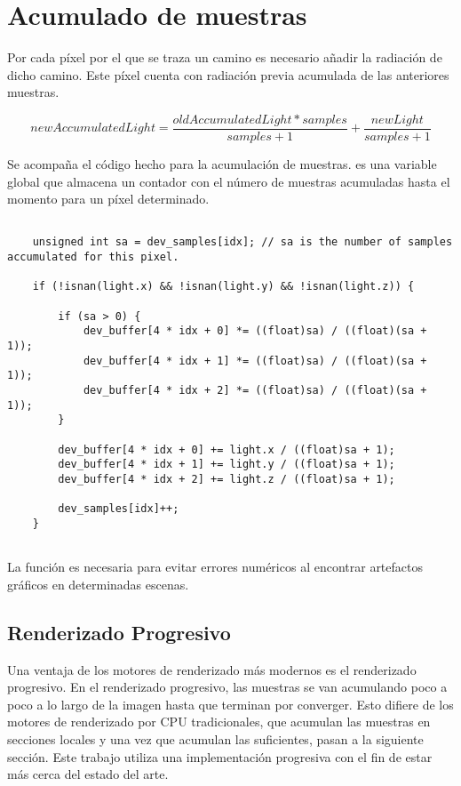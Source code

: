 \section{Acumulado de muestras}
	
Por cada píxel por el que se traza un camino es necesario añadir la radiación de dicho camino. Este píxel cuenta con radiación previa acumulada de las anteriores muestras.

\[{newAccumulatedLight = \frac{oldAccumulatedLight * samples}{samples + 1} + \frac{newLight}{samples + 1}}\]
	
Se acompaña el código hecho para la acumulación de muestras.  es una variable global que almacena un contador con el número de muestras acumuladas hasta el momento para un píxel determinado.

\begin{lstlisting}
	
	unsigned int sa = dev_samples[idx]; // sa is the number of samples accumulated for this pixel.
	
	if (!isnan(light.x) && !isnan(light.y) && !isnan(light.z)) {

        if (sa > 0) {
            dev_buffer[4 * idx + 0] *= ((float)sa) / ((float)(sa + 1));
            dev_buffer[4 * idx + 1] *= ((float)sa) / ((float)(sa + 1));
            dev_buffer[4 * idx + 2] *= ((float)sa) / ((float)(sa + 1));
        }

        dev_buffer[4 * idx + 0] += light.x / ((float)sa + 1);
        dev_buffer[4 * idx + 1] += light.y / ((float)sa + 1);
        dev_buffer[4 * idx + 2] += light.z / ((float)sa + 1);

        dev_samples[idx]++;
    }
	
\end{lstlisting}

La función  es necesaria para evitar errores numéricos al encontrar artefactos gráficos en determinadas escenas. 
	
\subsection{Renderizado Progresivo}
\label{progressiverender}
		
	Una ventaja de los motores de renderizado más modernos es el renderizado progresivo. En el renderizado progresivo, las muestras se van acumulando poco a poco a lo largo de la imagen hasta que terminan por converger. Esto difiere de los motores de renderizado por CPU tradicionales, que acumulan las muestras en secciones locales y una vez que acumulan las suficientes, pasan a la siguiente sección. Este trabajo utiliza una implementación progresiva con el fin de estar más cerca del estado del arte.
	
